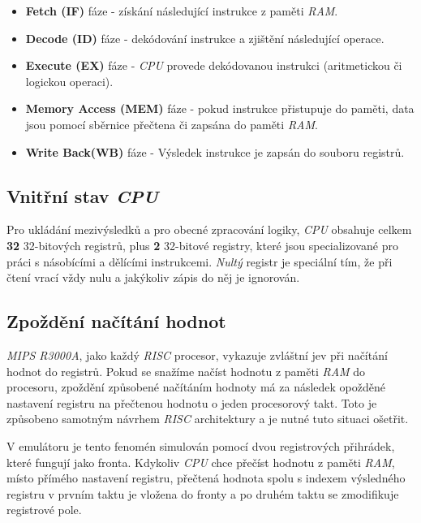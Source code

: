 \begin{itemize}
    \item{\textbf{Fetch (IF)} fáze - získání následující instrukce z paměti \textit{RAM}.}
    \item{\textbf{Decode (ID)} fáze - dekódování instrukce a zjištění následující operace.}
    \item{\textbf{Execute (EX)} fáze - \textit{CPU} provede dekódovanou instrukci (aritmetickou či logickou operaci).}
    \item{\textbf{Memory Access (MEM)} fáze - pokud instrukce přistupuje do paměti, data jsou pomocí sběrnice přečtena či zapsána do paměti \textit{RAM}.}
    \item{\textbf{Write Back(WB)} fáze - Výsledek instrukce je zapsán do souboru registrů.}
\end{itemize}

\subsection{Vnitřní stav \textit{CPU}}

Pro ukládání mezivýsledků a pro obecné zpracování logiky, \textit{CPU} obsahuje celkem \textbf{32} 32-bitových registrů, plus \textbf{2} 32-bitové registry, které
jsou specializované pro práci s násobícími a dělícími instrukcemi\cite{MIPSSpec}. 
\textit{Nultý} registr je speciální tím, že při čtení vrací vždy nulu a jakýkoliv zápis do něj je ignorován.

\subsection{Zpoždění načítání hodnot}

\textit{MIPS R3000A}, jako každý \textit{RISC} procesor, vykazuje zvláštní jev při načítání hodnot do registrů.
Pokud se snažíme načíst hodnotu z paměti \textit{RAM} do procesoru, zpoždění způsobené načítáním hodnoty má za následek
opožděné nastavení registru na přečtenou hodnotu o jeden procesorový takt\cite{MIPSSpec}. 
Toto je způsobeno samotným návrhem \textit{RISC} architektury a je nutné tuto situaci ošetřit. 

V emulátoru je tento fenomén simulován pomocí dvou registrových přihrádek, které fungují jako fronta.
Kdykoliv \textit{CPU} chce přečíst hodnotu z paměti \textit{RAM}, místo přímého nastavení registru,
přečtená hodnota spolu s indexem výsledného registru v prvním taktu je vložena do fronty a po druhém taktu se 
zmodifikuje registrové pole.

